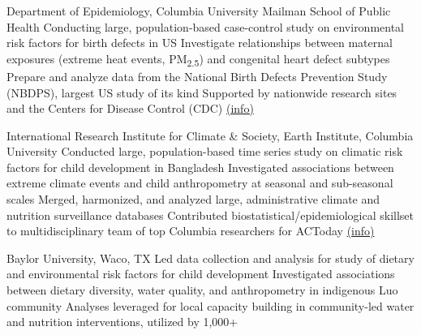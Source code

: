 \documentclass[hidelinks,10pt]{my_cv}
\begin{document}
	\vspace{0.2mm}
	{Department of Epidemiology, Columbia University Mailman School of Public Health}
	\subitemssss
		{Conducting large, population-based case-control study on environmental risk factors for birth defects in US}
		{Investigate relationships between maternal exposures (extreme heat events, PM\textsubscript{2.5}) and congenital heart defect subtypes}
		{Prepare and analyze data from the National Birth Defects Prevention Study (NBDPS), largest US study of its kind}
		{Supported by nationwide research sites and the Centers for Disease Control (CDC) \textcolor{blue}{\href{https://www.cdc.gov/ncbddd/birthdefects/nbdps.html}{(info)}}}

	\vspace{0.2mm}
	{International Research Institute for Climate \& Society, Earth Institute, Columbia University}
	\subitemssss
		{Conducted large, population-based time series study on climatic risk factors for child development in Bangladesh}
		{Investigated associations between extreme climate events and child anthropometry at seasonal and sub-seasonal scales}
		{Merged, harmonized, and analyzed large, administrative climate and nutrition surveillance databases}
		{Contributed biostatistical/epidemiological skillset to multidisciplinary team of top Columbia researchers for ACToday \textcolor{blue}{\href{https://iri.columbia.edu/actoday/}{(info)}}}

	\vspace{0.2mm}
	{Baylor University, Waco, TX}
	\subitemsss
		{Led data collection and analysis for study of dietary and environmental risk factors for child development}
		{Investigated associations between dietary diversity, water quality, and anthropometry in indigenous Luo community}
		{Analyses leveraged for local capacity building in community-led water and nutrition interventions, utilized by 1,000+}
\end{document}
